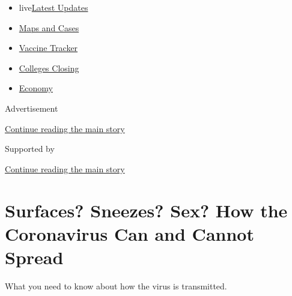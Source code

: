 \begin{itemize}
\tightlist
\item
  live\href{https://www.nytimes3xbfgragh.onion/2020/08/20/world/coronavirus-covid.html?name=styln-coronavirus-national\&region=TOP_BANNER\&variant=undefined\&block=storyline_menu_recirc\&action=click\&pgtype=Article\&impression_id=b3a4a9d0-e385-11ea-81c2-73c867635f43}{Latest
  Updates}
\item
  \href{https://www.nytimes3xbfgragh.onion/interactive/2020/us/coronavirus-us-cases.html?name=styln-coronavirus-national\&region=TOP_BANNER\&variant=undefined\&block=storyline_menu_recirc\&action=click\&pgtype=Article\&impression_id=b3a4a9d1-e385-11ea-81c2-73c867635f43}{Maps
  and Cases}
\item
  \href{https://www.nytimes3xbfgragh.onion/interactive/2020/science/coronavirus-vaccine-tracker.html?name=styln-coronavirus-national\&region=TOP_BANNER\&variant=undefined\&block=storyline_menu_recirc\&action=click\&pgtype=Article\&impression_id=b3a4a9d2-e385-11ea-81c2-73c867635f43}{Vaccine
  Tracker}
\item
  \href{https://www.nytimes3xbfgragh.onion/2020/08/19/us/colleges-closing-covid.html?name=styln-coronavirus-national\&region=TOP_BANNER\&variant=undefined\&block=storyline_menu_recirc\&action=click\&pgtype=Article\&impression_id=b3a4a9d3-e385-11ea-81c2-73c867635f43}{Colleges
  Closing}
\item
  \href{https://www.nytimes3xbfgragh.onion/live/2020/08/20/business/stock-market-today-coronavirus?name=styln-coronavirus-national\&region=TOP_BANNER\&variant=undefined\&block=storyline_menu_recirc\&action=click\&pgtype=Article\&impression_id=b3a4a9d4-e385-11ea-81c2-73c867635f43}{Economy}
\end{itemize}

Advertisement

\protect\hyperlink{after-top}{Continue reading the main story}

Supported by

\protect\hyperlink{after-sponsor}{Continue reading the main story}

\hypertarget{surfaces-sneezes-sex-how-the-coronavirus-can-and-cannot-spread}{%
\section{Surfaces? Sneezes? Sex? How the Coronavirus Can and Cannot
Spread}\label{surfaces-sneezes-sex-how-the-coronavirus-can-and-cannot-spread}}

What you need to know about how the virus is transmitted.

